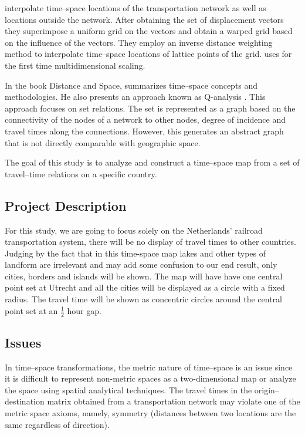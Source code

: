 \documentclass[a4paper,11pt]{article}
\begin{document}
 interpolate time--space locations of the transportation network
as well as locations outside the network. After obtaining the set of displacement vectors
they superimpose a uniform grid on the vectors and obtain a warped grid based on the
influence of the vectors. They employ an inverse distance weighting method to interpolate
time–space locations of lattice points of the grid.  uses for the first time
multidimensional scaling.

In the book Distance and Space,  summarizes time--space concepts and
methodologies. He also presents an approach known as Q-analysis
\cite{johnson}. This approach focuses on set relations. The set is represented as a graph
based on the connectivity of the nodes of a network to other nodes, degree of incidence and
travel times along the connections. However, this generates an abstract graph that is not
directly comparable with geographic space.

The goal of this study is to analyze and construct a time--space map from a set of travel--time
relations on a specific country.

\subsection{Project Description}
For this study, we are going to focus solely on the Netherlands' railroad transportation
system, there will be no display of travel times to other countries. Judging by the fact that
in this time-space map lakes and other types of landform are irrelevant and may add some
confusion to our end result, only cities, borders and islands will be shown.
The map will have have one central point set at Utrecht and all the cities will be displayed
as a circle with a fixed radius. The travel time will be shown as concentric circles around the
central point set at an $\frac{1}{2}$ hour gap.

\subsection{Issues}
In time–space transformations, the metric nature of time--space is an issue since it is difficult
to represent non-metric spaces as a two-dimensional map or analyze the space using
spatial analytical techniques. The travel times in the origin–destination matrix obtained from
a transportation network may violate one of the metric space axioms, namely, symmetry
(distances between two locations are the same regardless of direction).
\end{document}
